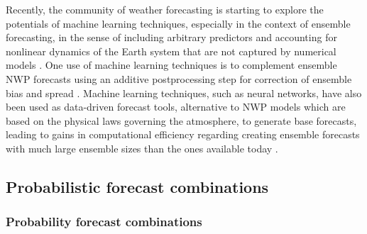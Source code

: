 \documentclass[11pt]{article}
\begin{document}
Recently, the community of weather forecasting is starting to explore the potentials of machine learning techniques, especially in the context of ensemble forecasting, in the sense of including arbitrary predictors and accounting for nonlinear dynamics of the Earth system that are not captured by numerical models \citep{Dueben2021-fe}. One use of machine learning techniques is to complement ensemble NWP \citep[numerical weather prediction, see, e.g.,][for a summary of its revolution]{Bauer2015-dg,Benjamin2019-zp} forecasts using an additive postprocessing step for correction of ensemble bias and spread \citep{Rasp2018-zu,Scher2018-dm,Gronquist2021-no}. Machine learning techniques, such as neural networks, have also been used as data-driven forecast tools, alternative to NWP models which are based on the physical laws governing the atmosphere, to generate base forecasts, leading to gains in computational efficiency regarding creating ensemble forecasts with much large ensemble sizes than the ones available today \citep{Dueben2018-ln,Scher2018-of,Rasp2021-az,Scher2021-ee}.

\subsection{Probabilistic forecast combinations}
\label{sec:probabilistic_forecast_combinations}

\subsubsection{Probability forecast combinations}
\label{sec:probability_forecast_combinations}

\end{document}
